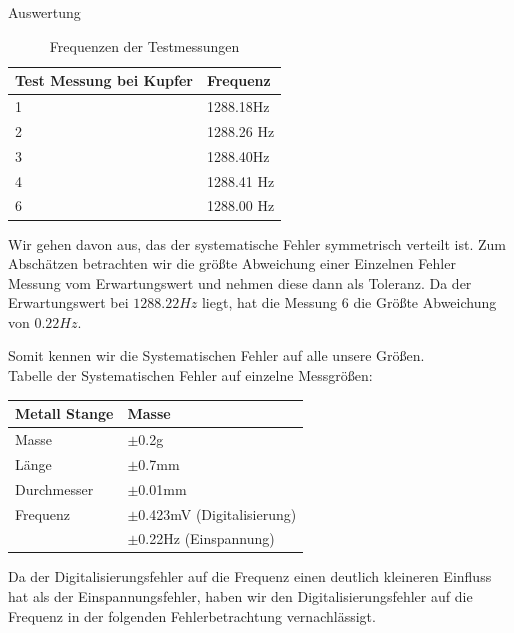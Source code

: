 \documentclass[twoside]{protokoll}
\begin{document}
\begin{aufgabe}{Auswertung}
\begin{table}[H]
    \centering
    \begin{tabularx}{0.7\textwidth}{X l} %
        \toprule
        \textbf{Test Messung bei Kupfer} & \textbf{Frequenz} \\
        \midrule
            1 & 1288.18Hz \\
            2 & 1288.26 Hz \\
            3 & 1288.40Hz \\
            4 & 1288.41 Hz \\
            6 & 1288.00 Hz \\
        \bottomrule
    \end{tabularx}
    \caption{Frequenzen der Testmessungen}
    \label{tab:mytable}
\end{table}

Wir gehen davon aus, das der systematische Fehler symmetrisch verteilt ist.
Zum Abschätzen betrachten wir die größte Abweichung einer Einzelnen Fehler Messung vom Erwartungswert und nehmen diese dann als Toleranz.
Da der Erwartungswert bei $1288.22 Hz$ liegt, hat die Messung 6 die Größte Abweichung von $0.22 Hz$.

Somit kennen wir die Systematischen Fehler auf alle unsere Größen.\\


Tabelle der Systematischen Fehler auf einzelne Messgrößen: 

\begin{table}[H]
    \centering
    \begin{tabularx}{0.8\textwidth}{X l} %
        \toprule
        \textbf{Metall Stange} & \textbf{Masse} \\
        \midrule
        Masse & $\pm$0.2g \\
        Länge & $\pm$0.7mm\\
        Durchmesser & $\pm$0.01mm \\
        Frequenz & $\pm$0.423mV (Digitalisierung)\\
        & $\pm$0.22Hz (Einspannung) \\
        \bottomrule
    \end{tabularx}
    \label{tab:mytable}
\end{table}

Da der Digitalisierungsfehler auf die Frequenz einen deutlich kleineren Einfluss hat als der Einspannungsfehler, haben wir den Digitalisierungsfehler auf die Frequenz in der folgenden Fehlerbetrachtung vernachlässigt.


\end{aufgabe}
\end{document}
